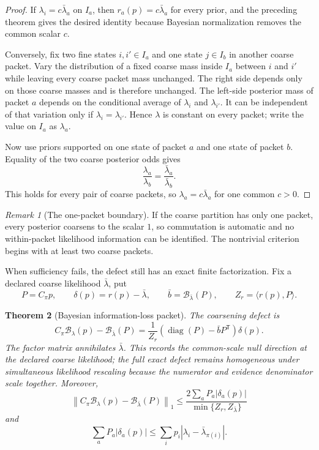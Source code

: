 \documentclass[11pt]{article}
\newtheorem{theorem}{Theorem}[section]
\theoremstyle{definition}
\theoremstyle{remark}
\newtheorem{remark}[theorem]{Remark}
\newcommand{\cB}{\mathcal B}
\newcommand{\diag}{\operatorname{diag}}
\begin{document}
\begin{proof}
If $\lambda_i=c\bar\lambda_a$ on $I_a$, then $r_a(p)=c\bar\lambda_a$ for every prior, and the preceding theorem gives the desired identity because Bayesian normalization removes the common scalar $c$.

Conversely, fix two fine states $i,i'\in I_a$ and one state $j\in I_b$ in another coarse packet.  Vary the distribution of a fixed coarse mass inside $I_a$ between $i$ and $i'$ while leaving every coarse packet mass unchanged.  The right side depends only on those coarse masses and is therefore unchanged.  The left-side posterior mass of packet $a$ depends on the conditional average of $\lambda_i$ and $\lambda_{i'}$.  It can be independent of that variation only if $\lambda_i=\lambda_{i'}$.  Hence $\lambda$ is constant on every packet; write the value on $I_a$ as $\lambda_a$.

Now use priors supported on one state of packet $a$ and one state of packet $b$.  Equality of the two coarse posterior odds gives
\[
\frac{\lambda_a}{\lambda_b}
=
\frac{\bar\lambda_a}{\bar\lambda_b}.
\]
This holds for every pair of coarse packets, so $\lambda_a=c\bar\lambda_a$ for one common $c>0$.
\end{proof}

\begin{remark}[The one-packet boundary]
If the coarse partition has only one packet, every posterior coarsens to the scalar $1$, so commutation is automatic and no within-packet likelihood information can be identified.  The nontrivial criterion begins with at least two coarse packets.
\end{remark}

When sufficiency fails, the defect still has an exact finite factorization.  Fix a declared coarse likelihood $\bar\lambda$, put
\[
P=C_\pi p,
\qquad
\delta(p)=r(p)-\bar\lambda,
\qquad
\bar b=\cB_{\bar\lambda}(P),
\qquad
Z_r=\langle r(p),P\rangle.
\]

\begin{theorem}[Bayesian information-loss packet]
The coarsening defect is
\[
\boxed{
C_\pi\cB_\lambda(p)
-
\cB_{\bar\lambda}(P)
=
\frac{1}{Z_r}
\left(\diag(P)-\bar bP^{\mathsf T}\right)
\delta(p).}
\]
The factor matrix annihilates $\bar\lambda$.  This records the common-scale null direction at the declared coarse likelihood; the full exact defect remains homogeneous under simultaneous likelihood rescaling because the numerator and evidence denominator scale together.  Moreover,
\[
\boxed{
\left\|C_\pi\cB_\lambda(p)-\cB_{\bar\lambda}(P)\right\|_1
\le
\frac{2\sum_aP_a|\delta_a(p)|}
{\min\{Z_r,Z_{\bar\lambda}\}}}
\]
and
\[
\sum_aP_a|\delta_a(p)|
\le
\sum_i p_i\left|\lambda_i-\bar\lambda_{\pi(i)}\right|.
\]
\end{theorem}
\end{document}
